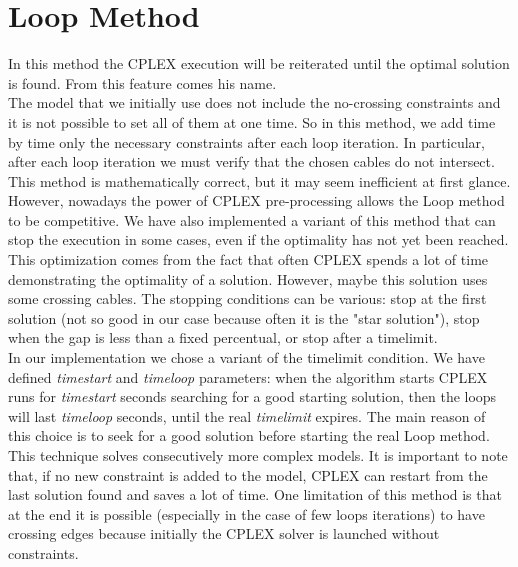 \section{Loop Method}
In this method the \textsc{CPLEX} execution will be reiterated until the optimal solution is found. From this feature comes his name. \\
The model that we initially use does not include the no-crossing constraints and it is not possible to set all of them at one time. So in this method, we add time by time only the necessary constraints after each loop iteration. In particular, after each loop iteration we must verify that the chosen cables do not intersect.\\
This method is mathematically correct, but it may seem inefficient at first glance. However, nowadays the power of \textsc{CPLEX} pre-processing allows the Loop method to be competitive. We have also implemented a variant of this method that can stop the execution in some cases, even if the optimality has not yet been reached. This optimization comes from the fact that often \textsc{CPLEX} spends a lot of time demonstrating the optimality of a solution. However, maybe this solution uses some crossing cables. The stopping conditions can be various: stop at the first solution (not so good in our case because often it is the "star solution"), stop when the gap is less than a fixed percentual, or stop after a timelimit. \\
In our implementation we chose a variant of the timelimit condition. We have defined \textit{timestart} and \textit{timeloop} parameters: when the algorithm starts \textsc{CPLEX} runs for \textit{timestart} seconds searching for a good starting solution, then the loops will last \textit{timeloop} seconds, until the real \textit{timelimit} expires. The main reason of this choice is to seek for a good solution before starting the real Loop method. \\ 
This technique solves consecutively more complex models. It is important to note that, if no new constraint is added to the model, \textsc{CPLEX} can restart from the last solution found and saves a lot of time. One limitation of this method is that at the end it is possible (especially in the case of few loops iterations) to have crossing edges because initially the \textsc{CPLEX} solver is launched without constraints. 
